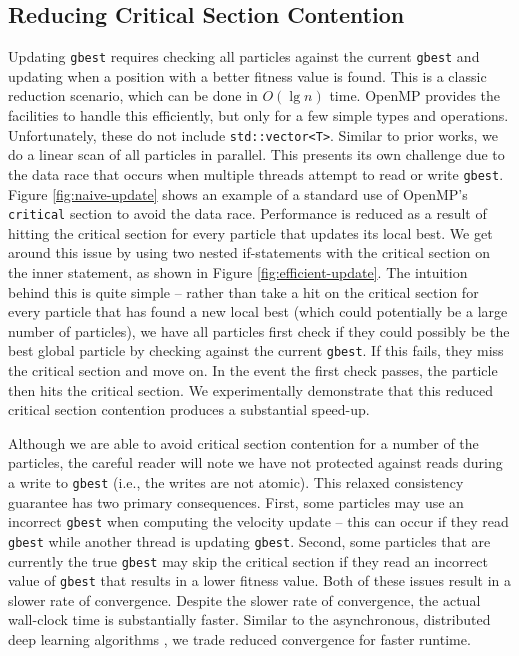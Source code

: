 \subsection{Reducing Critical Section Contention}
Updating \texttt{gbest}
requires checking all particles against the current \texttt{gbest} and updating
when a position with a better fitness value is found. This is a classic
reduction scenario, which can be done in $O(\lg n)$ time. OpenMP provides the
facilities to handle this efficiently, but only for a few simple types and
operations. Unfortunately, these do not include \texttt{std::vector<T>}. Similar to
prior works, we do a linear scan of all particles in parallel. This presents its
own challenge due to the data race that occurs when multiple threads attempt to
read or write \texttt{gbest}. Figure \ref{fig:naive-update} shows an example of a
standard use of OpenMP's \texttt{critical} section to avoid the data race.
Performance is reduced as a result of hitting the critical section for every
particle that updates its local best. We get around this issue by using two nested if-statements
with the critical section on the inner statement, as shown in Figure
\ref{fig:efficient-update}. The intuition behind this is quite simple -- rather
than take a hit on the critical section for every particle that has found a new
local best (which could potentially be a large number of particles), we
have all particles first check if they could possibly be the best global
particle by checking against the current \texttt{gbest}. If this fails, they
miss the critical section and move on. In the event the first check passes, the
particle then hits the critical section. We experimentally demonstrate that this
reduced critical section contention produces a substantial speed-up.

Although we are able to avoid critical section contention for a number of the
particles, the careful reader will note we have not protected against reads
during a write to \texttt{gbest} (i.e., the writes are not atomic).
This relaxed consistency guarantee has two primary
consequences. First, some particles may use an incorrect \texttt{gbest} when
computing the velocity update -- this can occur if they read \texttt{gbest}
while another thread is updating \texttt{gbest}. Second, some particles that are
currently the true \texttt{gbest} may skip the critical section if they read an
incorrect value of \texttt{gbest} that results in a lower fitness value. Both of
these issues result in a slower rate of convergence. Despite the slower rate of convergence,
the actual wall-clock time is substantially faster. Similar to the asynchronous,
distributed deep learning algorithms \cite{adam, downpour}, we trade reduced convergence for
faster runtime.


